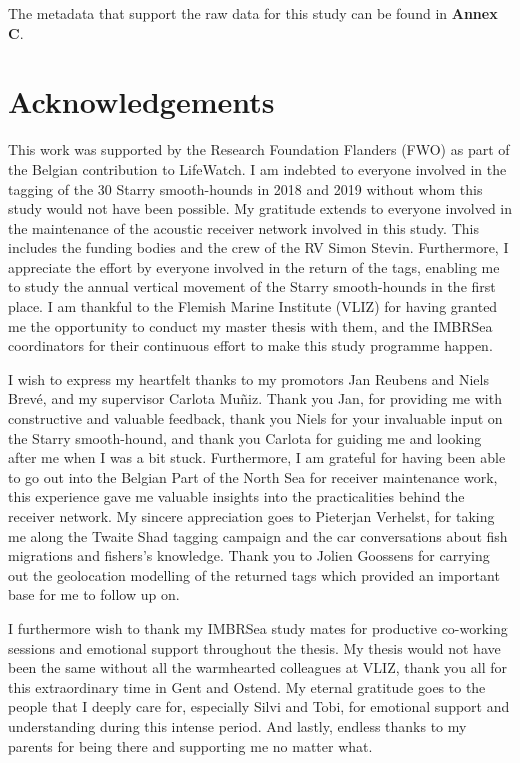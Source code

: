\documentclass[
  authoryear,
  review,
  3p]{elsarticle}
\begin{document}
The metadata that support the raw data for this study can be found in
\textbf{Annex C}.

\newpage{}

\hypertarget{acknowledgements}{%
\section*{Acknowledgements}\label{acknowledgements}}

This work was supported by the Research Foundation Flanders (FWO) as
part of the Belgian contribution to LifeWatch. I am indebted to everyone
involved in the tagging of the 30 Starry smooth-hounds in 2018 and 2019
without whom this study would not have been possible. My gratitude
extends to everyone involved in the maintenance of the acoustic receiver
network involved in this study. This includes the funding bodies and the
crew of the RV Simon Stevin. Furthermore, I appreciate the effort by
everyone involved in the return of the tags, enabling me to study the
annual vertical movement of the Starry smooth-hounds in the first place.
I am thankful to the Flemish Marine Institute (VLIZ) for having granted
me the opportunity to conduct my master thesis with them, and the
IMBRSea coordinators for their continuous effort to make this study
programme happen.

I wish to express my heartfelt thanks to my promotors Jan Reubens and
Niels Brevé, and my supervisor Carlota Muñiz. Thank you Jan, for
providing me with constructive and valuable feedback, thank you Niels
for your invaluable input on the Starry smooth-hound, and thank you
Carlota for guiding me and looking after me when I was a bit stuck.
Furthermore, I am grateful for having been able to go out into the
Belgian Part of the North Sea for receiver maintenance work, this
experience gave me valuable insights into the practicalities behind the
receiver network. My sincere appreciation goes to Pieterjan Verhelst,
for taking me along the Twaite Shad tagging campaign and the car
conversations about fish migrations and fishers's knowledge. Thank you
to Jolien Goossens for carrying out the geolocation modelling of the
returned tags which provided an important base for me to follow up on.

I furthermore wish to thank my IMBRSea study mates for productive
co-working sessions and emotional support throughout the thesis. My
thesis would not have been the same without all the warmhearted
colleagues at VLIZ, thank you all for this extraordinary time in Gent
and Ostend. My eternal gratitude goes to the people that I deeply care
for, especially Silvi and Tobi, for emotional support and understanding
during this intense period. And lastly, endless thanks to my parents for
being there and supporting me no matter what.
\end{document}
